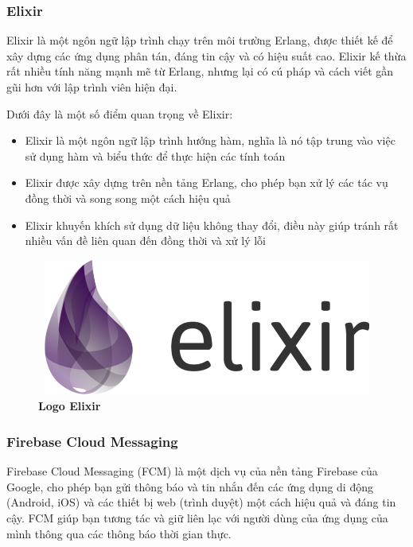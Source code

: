 \subsubsection{Elixir}
Elixir là một ngôn ngữ lập trình chạy trên môi trường Erlang, được thiết kế để xây dựng các ứng dụng phân tán, 
đáng tin cậy và có hiệu suất cao. Elixir kế thừa rất nhiều tính năng mạnh mẽ từ Erlang, nhưng lại có cú pháp 
và cách viết gần gũi hơn với lập trình viên hiện đại.

Dưới đây là một số điểm quan trọng về Elixir:
\begin{itemize}
  \item Elixir là một ngôn ngữ lập trình hướng hàm, nghĩa là nó tập trung vào việc sử dụng hàm và biểu thức để thực hiện các tính toán
  \item Elixir được xây dựng trên nền tảng Erlang, cho phép bạn xử lý các tác vụ đồng thời và song song một cách hiệu quả
  \item Elixir khuyến khích sử dụng dữ liệu không thay đổi, điều này giúp tránh rất nhiều vấn đề liên quan đến đồng thời và xử lý lỗi
\end{itemize}

\begin{figure}[H]
  \centering
  \includegraphics[width=12cm,height=4.5cm]{Images/pancake/elixir.png}
  \caption[Logo Elixir]{\bfseries \fontsize{12pt}{0pt}
  \selectfont Logo Elixir}
  \label{firebase_cover} 
\end{figure}


\subsubsection{Firebase Cloud Messaging}

Firebase Cloud Messaging (FCM) là một dịch vụ của nền tảng Firebase của Google, cho phép bạn gửi thông báo và 
tin nhắn đến các ứng dụng di động (Android, iOS) và các thiết bị web (trình duyệt) một cách hiệu quả và đáng tin cậy. 
FCM giúp bạn tương tác và giữ liên lạc với người dùng của ứng dụng của mình thông qua các thông báo thời gian thực.

